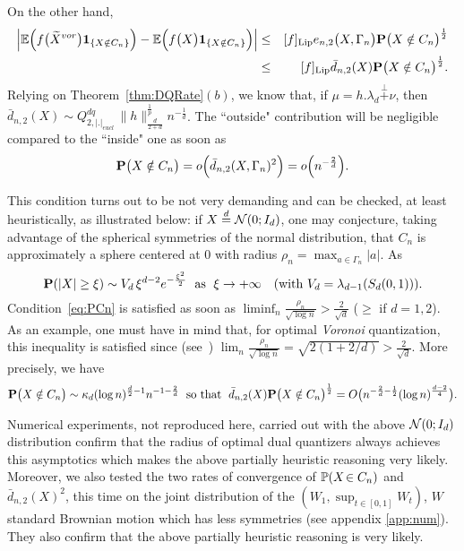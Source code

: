 On the other  hand, 
\begin{eqnarray*}
\left|\mathbb{E}\Big(f\big(\widetilde X^{vor}\big) \mbox{\bf 1}_{\{X\notin C_{n}\}} \Big)-\mathbb{E}\Big(f\big( X\big) \mbox{\bf 1}_{\{X\notin C_{n}\}} \Big)\right|&\le& [f]_{\rm Lip}  e_{n,2}\big(X,\Gamma_n\big)\mathbf{P}\big(X\notin C_{n}\big)^{\frac 12}\\
& \le& [f]_{\rm Lip}\bar d_{n,2}(X)\mathbf{P}\big(X\notin C_{n}\big)^{\frac 12}. 
\end{eqnarray*}
Relying on Theorem~\ref{thm:DQRate}$(b)$, we know that, if $\mu = h.\lambda_d \stackrel{\perp}{+} \nu$, then  $\bar d_{n,2}(X)\sim  Q^{dq}_{2,|.|_{eucl}}\,\|h\|_{\frac{d}{2+d}}^{\frac 1p} n^{-\frac 1d}$. 
The ``outside" contribution will be negligible compared to the    ``inside" one as soon as 
\begin{equation}\label{eq:PCn}
\Probb\big(X\notin C_{n}\big) = o\Big( \bar d_{n,2}(X,\Gamma_{n})^2 \Big)=  o\Big( n^{-\frac 2d}\Big).
\end{equation}

 This condition turns out to be  not very demanding and can be checked, at least heuristically, as illustrated below: if $X\stackrel{d}{=} {\cal N}(0;I_d)$, one may conjecture, taking advantage of the spherical symmetries of the normal  distribution, that $C_{n}$ is approximately a sphere centered at $0$ with radius $\rho_{n}= \max_{a\in \Gamma_{n}}|a|$.
As 
 \[
 \mathbf{P}(|X|\ge \xi) \sim V_d\,\xi^{d-2}e^{-\frac{\xi^2}{2}}\;\mbox{ as }\; \xi\to +\infty\quad (\mbox{with }V_d=\lambda_{d-1}(S_d(0,1))).
 \]
Condition~\eqref{eq:PCn} is satisfied as soon as $\liminf_n \frac{\rho_{n}}{\sqrt{\log n}}>\frac{2}{\sqrt{d}}$ ($\ge $ if $d=1,2$). As an example, one must have in mind that, for optimal {\em Voronoi} quantization, this inequality is satisfied since (see~\cite{PASA}) $\lim_n \frac{\rho_{n}}{\sqrt{\log n}}=\sqrt{2(1+2/d)}>\frac{2}{\sqrt{d}}$. More precisely, we have
\[
\mathbf{P}\big(X\notin C_{n}\big)\sim \kappa_d(\log n)^{\frac d2-1}n^{-1-\frac 2d} \; \mbox{ so that }\; \bar d_{n,2}(X)\mathbf{P}\big(X\notin C_{n}\big)^{\frac 12} = O\big(n^{-\frac 2d-\frac 12}(\log n)^{\frac{d-2}{4}}\big).
\] 
 
Numerical experiments, not reproduced here, carried out with the above ${\cal N}(0;I_d)$ distribution confirm   that the radius of optimal dual quantizers always achieves this asymptotics which makes the above partially heuristic reasoning very likely. Moreover, we also tested the two rates of convergence of $\mathbb{P}(X\!\in C_n)$ and $\bar d_{n,2}(X)^2$, this time on the joint distribution of the $(W_1, \sup_{t\in [0,1]}W_t)$, $W$ standard Brownian motion which has less symmetries (see appendix \ref{app:num}). They also confirm that the above partially heuristic reasoning is very likely. 




